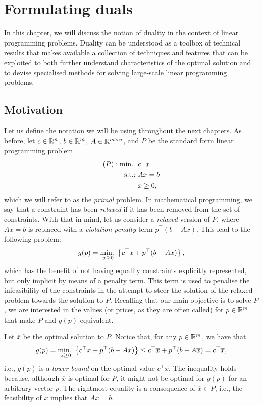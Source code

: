 \section{Formulating duals}

In this chapter, we will discuss the notion of duality in the context of linear programming problems. Duality can be understood as a toolbox of technical results that makes available a collection of techniques and features that can be exploited to both further understand characteristics of the optimal solution and to devise specialised methods for solving large-scale linear programming problems.


\subsection{Motivation}

Let us define the notation we will be using throughout the next chapters. As before, let $c \in \mathbb{R}^n$, $b \in \mathbb{R}^m$, $A \in \mathbb{R}^{m \times n}$, and $P$ be the standard form linear programming problem
%
\begin{align*}
	(P) : \mathop{\text{min.~}} \ & c^\top x \\
	\mathop{\text{s.t.:~}} 	  & Ax = b \\
		  & x \geq 0,   
\end{align*}
%
which we will refer to as the \emph{primal} problem.  In mathematical programming, we say that a constraint has been \emph{relaxed} if it has been removed from the set of constraints. With that in mind, let us consider a \emph{relaxed} version of $P$, where $Ax = b$ is replaced with a \emph{violation penalty} term $p^\top (b - Ax)$. This lead to the following problem:
%
\begin{equation*}
	g(p) = \mathop{\text{min.~}}_{x \geq 0} \left\{ c^\top x + p^\top (b - Ax) \right \},
\end{equation*}
%
which has the benefit of not having equality constraints explicitly represented, but only implicit by means of a penalty term. This term is used to penalise the infeasibility of the constraints in the attempt to steer the solution of the relaxed problem towards the solution to $P$. Recalling that our main objective is to solve $P$, we are interested in the values (or prices, as they are often called) for $p \in \mathbb{R}^m$ that make $P$ and $g(p)$ equivalent.

Let $\overline{x}$ be the optimal solution to $P$. Notice that, for any $p \in \mathbb{R}^m$, we have that
%
\begin{equation*}
	g(p) = \mathop{\text{min.~}}_{x \geq 0} \left\{ c^\top x + p^\top (b - Ax) \right \} \leq c^\top \overline{x} +  p^\top (b - A\overline{x}) = c^\top \overline{x},   
\end{equation*}
%
i.e., $g(p)$ is a \emph{lower bound} on the optimal value $c^\top \overline{x}$. The inequality holds because, although $\overline{x}$ is optimal for $P$, it might not be optimal for $g(p)$ for an arbitrary vector $p$. The rightmost equality is a consequence of $\overline{x} \in P$, i.e., the feasibility of $\overline{x}$ implies that $A\overline{x} = b$.

